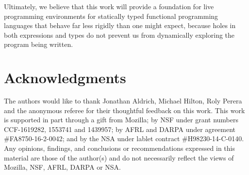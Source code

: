 Ultimately, we believe that this work will provide a foundation for live programming environments for statically typed functional programming languages that behave far less rigidly than one might expect, because holes in both expressions and types do not prevent us from dynamically exploring the program being written.

\section*{Acknowledgments}
The authors would like to thank Jonathan Aldrich, Michael Hilton, Roly Perera and the anonymous referee for their thoughtful feedback on this work. This work is supported in part through a gift from Mozilla; by NSF under grant numbers CCF-1619282, 1553741 and 1439957; by AFRL and DARPA under agreement \#FA8750-16-2-0042; and by the NSA under lablet contract \#H98230-14-C-0140. Any opinions, findings, and conclusions or recommendations expressed in this material are those of the author(s) and do not necessarily reflect the views of Mozilla, NSF, AFRL, DARPA or NSA.
